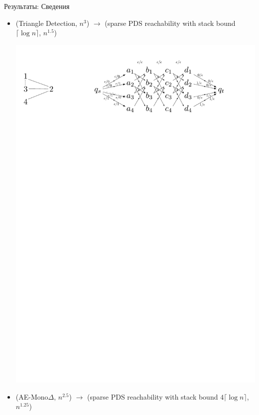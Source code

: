 \documentclass{beamer}
\begin{document}
\begin{frame}{Результаты: Сведения}
	\begin{itemize}
		\item (Triangle Detection, $n^{3}$) $\rightarrow$ (sparse PDS reachability with stack bound $\lceil \log n \rceil$,  $n^{1.5}$)
		
		\begin{center}
			\includegraphics[scale=0.5]{./pictures/triangle_to_pds.pdf}
		\end{center}
		
		\item (AE-Mono$\Delta$, $n^{2.5}$) $\rightarrow$ (sparse PDS reachability with stack bound $4\lceil \log n \rceil$,  $n^{1.25}$)
		

\end{itemize}
\end{frame}
\end{document}
